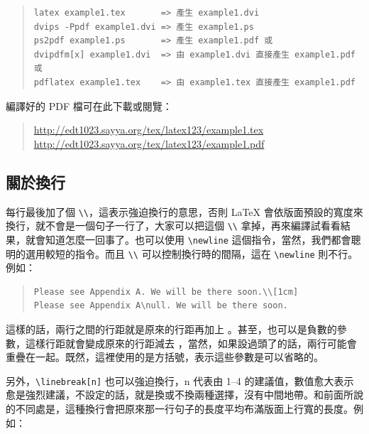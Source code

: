 \begin{quote}
   \begin{verbatim}
latex example1.tex       => 產生 example1.dvi
dvips -Ppdf example1.dvi => 產生 example1.ps
ps2pdf example1.ps       => 產生 example1.pdf 或
dvipdfm[x] example1.dvi  => 由 example1.dvi 直接產生 example1.pdf 或
pdflatex example1.tex    => 由 example1.tex 直接產生 example1.pdf
\end{verbatim}
\end{quote}

編譯好的 PDF 檔可在此下載或閱覽：

\begin{quote}
   \url{http://edt1023.sayya.org/tex/latex123/example1.tex}  \\
   \url{http://edt1023.sayya.org/tex/latex123/example1.pdf}
\end{quote}

\subsection{關於換行}

每行最後加了個 \verb|\\|\index{\\@\verb=\\=}，這表示強迫換行的意思，否則 \LaTeX{} 會依版面預設的寬度來換行，就不會是一個句子一行了，大家可以把這個 \verb|\\| 拿掉，再來編譯試看看結果，就會知道怎麼一回事了。也可以使用 \verb|\newline| 這個指令，當然，我們都會聰明的選用較短的指令。而且 \verb|\\| 可以控制換行時的間隔，這在 \verb|\newline| 則不行。例如：

\begin{quote}
   \begin{verbatim}
Please see Appendix A. We will be there soon.\\[1cm]
Please see Appendix A\null. We will be there soon.
\end{verbatim}
\end{quote}

這樣的話，兩行之間的行距就是原來的行距再加上 {\ttfamily 1cm}。甚至，也可以是負數的參數，這樣行距就會變成原來的行距減去 {\ttfamily 1cm}，當然，如果設過頭了的話，兩行可能會重疊在一起。既然，這裡使用的是方括號，表示這些參數是可以省略的。

另外，\verb|\linebreak[n]| 也可以強迫換行，{\ttfamily n} 代表由 1--4 的建議值，數值愈大表示愈是強烈建議，不設定的話，就是換或不換兩種選擇，沒有中間地帶。和前面所說的不同處是，這種換行會把原來那一行句子的長度平均布滿版面上行寬的長度。例如：

